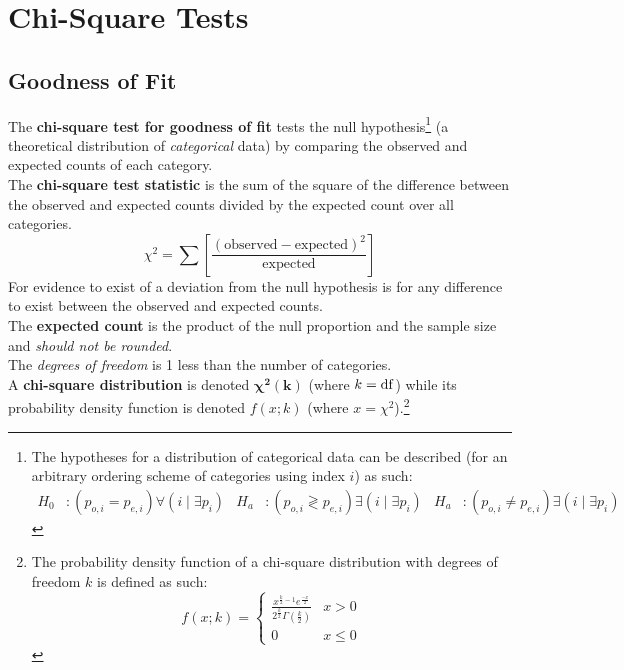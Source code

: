 \documentclass[../AP_Statistics.tex]{subfiles}
\begin{document}
	\chapter{Chi-Square Tests}
		\section{Goodness of Fit}
			The \textbf{chi-square test for goodness of fit} tests the null hypothesis\footnote{The hypotheses for a distribution of categorical data can be described (for an arbitrary ordering scheme of categories using index $i$) as such:\begin{align*}H_0&:(p_{o, i} = p_{e, i})\forall(i \mid \exists p_i) & H_a&:(p_{o, i} \gtrless p_{e, i})\exists(i \mid \exists p_i) & H_a &:(p_{o, i} \ne p_{e, i})\exists(i \mid \exists p_i) \end{align*}} (a theoretical distribution of \emph{categorical} data) by comparing the observed and expected counts of each category. \\
			The \textbf{chi-square test statistic} is the sum of the square of the difference between the observed and expected counts divided by the expected count over all categories.
			\[\chi^2 = \sum\left[\mathrm{\frac{(observed - expected)^2}{expected}}\right]\]
			For evidence to exist of a deviation from the null hypothesis is for any difference to exist between the observed and expected counts. \\
			The \textbf{expected count} is the product of the null proportion and the sample size and \emph{should not be rounded}. \\
			The \emph{degrees of freedom} is 1 less than the number of categories. \\
			A \textbf{chi-square distribution} is denoted $\bm{\chi^2(k)}$ (where $k = \operatorname{\mathrm{df}}$) while its probability density function is denoted $f(x;k)$ (where $x = \chi^2$).\footnote{The probability density function of a chi-square distribution with degrees of freedom $k$ is defined as such:\[f(x;k) = \begin{cases}\frac{x^{\frac{k}{2} - 1}e^{\frac{-x}{2}}}{2^{\frac{k}{2}}\Gamma\left(\frac{k}{2}\right)} & x > 0 \\ 0 & x \le 0 \end{cases}\]}
\end{document}

